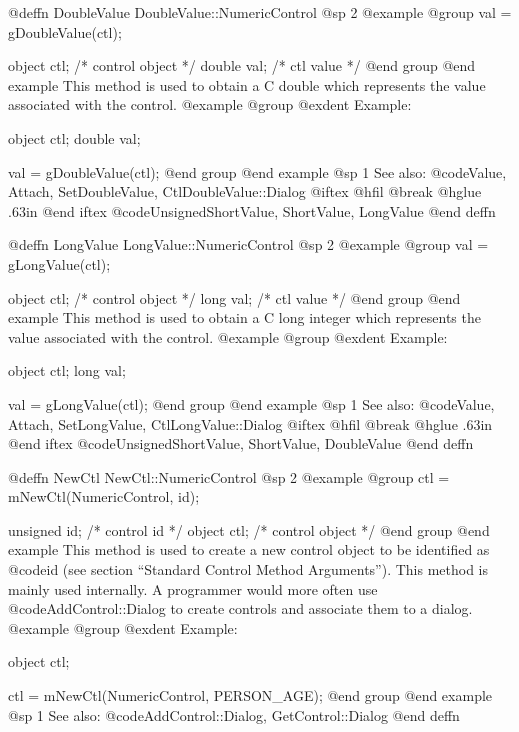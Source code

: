 @deffn {DoubleValue} DoubleValue::NumericControl
@sp 2
@example
@group
val = gDoubleValue(ctl);

object  ctl;   /*  control object  */
double  val;   /*  ctl value       */
@end group
@end example
This method is used to obtain a C double which represents the
value associated with the control.  
@example
@group
@exdent Example:

object  ctl;
double  val;

val = gDoubleValue(ctl);
@end group
@end example
@sp 1
See also:  @code{Value, Attach, SetDoubleValue, CtlDoubleValue::Dialog}
@iftex
@hfil @break @hglue .63in 
@end iftex
@code{UnsignedShortValue, ShortValue, LongValue}
@end deffn











@deffn {LongValue} LongValue::NumericControl
@sp 2
@example
@group
val = gLongValue(ctl);

object  ctl;   /*  control object  */
long    val;   /*  ctl value       */
@end group
@end example
This method is used to obtain a C long integer which represents the
value associated with the control.  
@example
@group
@exdent Example:

object  ctl;
long    val;

val = gLongValue(ctl);
@end group
@end example
@sp 1
See also:  @code{Value, Attach, SetLongValue, CtlLongValue::Dialog}
@iftex
@hfil @break @hglue .63in 
@end iftex
@code{UnsignedShortValue, ShortValue, DoubleValue}
@end deffn








@deffn {NewCtl} NewCtl::NumericControl
@sp 2
@example
@group
ctl = mNewCtl(NumericControl, id);

unsigned  id;   /*  control id      */
object   ctl;   /*  control object  */
@end group
@end example
This method is used to create a new control object to be identified as
@code{id} (see section ``Standard Control Method Arguments'').  This
method is mainly used internally.  A programmer would more often
use @code{AddControl::Dialog} to create controls and associate them
to a dialog.
@example
@group
@exdent Example:

object  ctl;

ctl = mNewCtl(NumericControl, PERSON_AGE);
@end group
@end example
@sp 1
See also:  @code{AddControl::Dialog, GetControl::Dialog}
@end deffn









